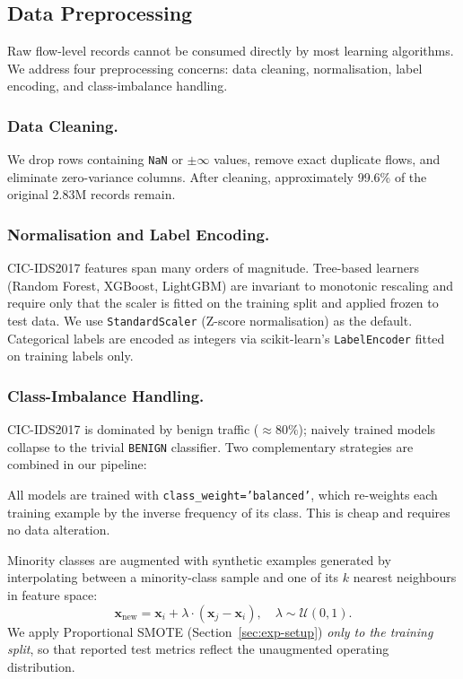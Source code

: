 \subsection{Data Preprocessing}
\label{sec:bg-preproc}

Raw flow-level records cannot be consumed directly by most learning algorithms. We address four preprocessing concerns: data cleaning, normalisation, label encoding, and class-imbalance handling.

\subsubsection*{Data Cleaning.}
We drop rows containing \texttt{NaN} or $\pm\infty$ values, remove exact duplicate flows, and eliminate zero-variance columns. After cleaning, approximately 99.6\% of the original 2.83M records remain.

\subsubsection*{Normalisation and Label Encoding.}
CIC-IDS2017 features span many orders of magnitude. Tree-based learners (Random Forest, XGBoost, LightGBM) are invariant to monotonic rescaling and require only that the scaler is fitted on the training split and applied frozen to test data. We use \texttt{StandardScaler} (Z-score normalisation) as the default. Categorical labels are encoded as integers via scikit-learn's \texttt{LabelEncoder} fitted on training labels only.

\subsubsection*{Class-Imbalance Handling.}
CIC-IDS2017 is dominated by benign traffic ($\approx 80\%$); naively trained models collapse to the trivial \texttt{BENIGN} classifier. Two complementary strategies are combined in our pipeline:

\begin{description}[leftmargin=1.2em,itemsep=2pt,topsep=2pt]
    \item[Cost-sensitive weighting.] All models are trained with \texttt{class\_weight='balanced'}, which re-weights each training example by the inverse frequency of its class. This is cheap and requires no data alteration.
    \item[SMOTE oversampling~\cite{ref_smote}.] Minority classes are augmented with synthetic examples generated by interpolating between a minority-class sample and one of its $k$ nearest neighbours in feature space:
    \begin{equation}
        \mathbf{x}_{\text{new}} = \mathbf{x}_i + \lambda \cdot (\mathbf{x}_{j} - \mathbf{x}_i), \quad \lambda \sim \mathcal{U}(0,1).
    \end{equation}
    We apply Proportional SMOTE (Section~\ref{sec:exp-setup}) \emph{only to the training split}, so that reported test metrics reflect the unaugmented operating distribution.
\end{description}
